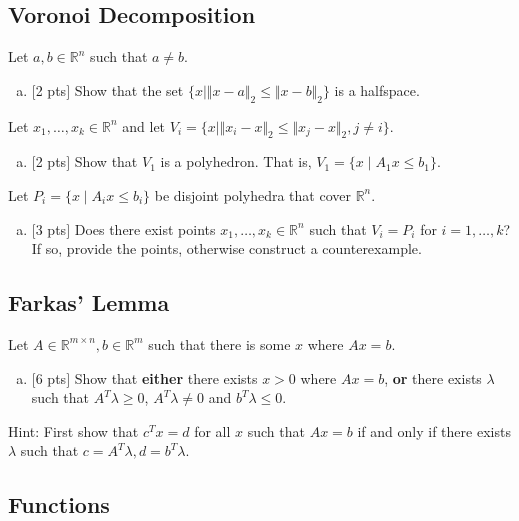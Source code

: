 \documentclass[12pt]{article}
\begin{document}
\subsection{Voronoi Decomposition}

Let $a,b\in\mathbb{R}^n$ such that $a\ne b$.
\begin{enumerate}[(a)]
\item
$[$2 pts$]$  Show that the set $\{ x \mid \Vert x-a \Vert_2 \le \Vert x-b \Vert_2\}$ is a halfspace.
\end{enumerate}

\vspace{.25cm} 

\noindent Let $x_1,\ldots,x_k\in\mathbb{R}^n$ and let $V_i = \{x \mid \Vert x_i-x \Vert_2 \le \Vert x_j-x \Vert_2, j\ne i \}$.
\begin{enumerate}[(b)]
\item
$[$2 pts$]$  Show that $V_1$ is a polyhedron.  That is, $V_1 = \{x \mid A_1x \le b_1\}$.
\end{enumerate}

\vspace{.25cm}

\noindent Let $P_i = \{x \mid A_ix \le b_i\}$ be disjoint polyhedra that cover $\mathbb{R}^n$.
\begin{enumerate}[(c)]
\item
 $[$3 pts$]$  Does there exist points $x_1,\ldots,x_k\in\mathbb{R}^n$ such that $V_i = P_i$ for $i = 1,\ldots,k$?  If so, provide the points, otherwise construct a counterexample.
\end{enumerate}

\subsection{Farkas' Lemma}

Let $A\in\mathbb{R}^{m\times n}, b\in\mathbb{R}^m$ such that there is some $x$ where $Ax = b$.

\begin{enumerate}[(a)]
\item
$[$6 pts$]$  Show that {\bf either} there exists $x > 0$ where $Ax = b$, {\bf or} there exists $\lambda$ such that $A^T\lambda \ge 0$, $A^T\lambda \ne 0$ and $b^T\lambda \le 0$.
\end{enumerate}
Hint: First show that $c^Tx = d$ for all $x$ such that $Ax = b$ if and only if there exists $\lambda$ such that $c= A^T\lambda, d=b^T\lambda$.

\subsection{Functions}
\end{document}
